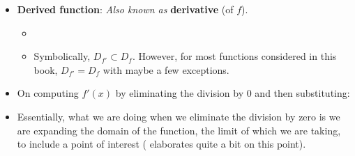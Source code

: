\documentclass[../main.tex]{subfiles}
\begin{document}
\begin{itemize}
\begin{enumerate}
    \end{enumerate}
    \item \textbf{Derived function}:  \emph{Also known as} \textbf{derivative} (of $f$).
    \begin{itemize}
        \item {}
        \item Symbolically, $D_{f'}\subset D_f$. However, for most functions considered in this book, $D_{f'}=D_f$ with maybe a few exceptions.
    \end{itemize}
    \item On computing $f'(x)$ by eliminating the division by 0 and then substituting: 
    \item Essentially, what we are doing when we eliminate the division by zero is we are expanding the domain of the function, the limit of which we are taking, to include a point of interest (\textcite{bib:Thomas} elaborates quite a bit on this point).
\end{itemize}
\end{document}
